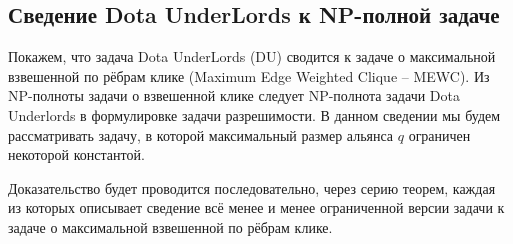 \documentclass{article}
\begin{document}
\subsection{Сведение Dota UnderLords к NP-полной задаче}
Покажем, что задача Dota UnderLords (DU) сводится к задаче о максимальной взвешенной по рёбрам клике (Maximum Edge Weighted Clique – MEWC).
Из NP-полноты  задачи о взвешенной клике  следует NP-полнота задачи Dota Underlords в формулировке задачи разрешимости. В данном сведении мы будем рассматривать задачу, в которой максимальный размер альянса $q$ ограничен некоторой константой.

Доказательство будет проводится последовательно, через серию теорем, каждая из которых описывает сведение всё менее и менее ограниченной версии задачи к задаче о максимальной взвешенной по рёбрам клике.



%
%
%
\end{document}

